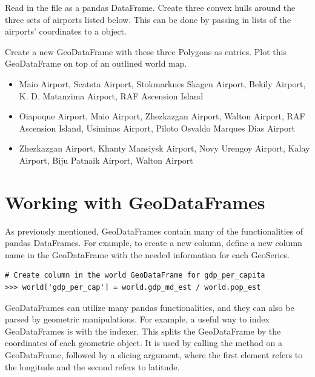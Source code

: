 \begin{problem}
Read in the file  as a pandas DataFrame.
Create three convex hulls around the three sets of airports listed below.
This can be done by passing in lists of the airports' coordinates to a  object.

Create a new GeoDataFrame with these three Polygons as entries.
Plot this GeoDataFrame on top of an outlined world map.
\begin{itemize} %
	\item Maio Airport, Scatsta Airport, Stokmarknes Skagen Airport, Bekily Airport, K. D. Matanzima Airport, RAF Ascension Island
	\item Oiapoque Airport, Maio Airport, Zhezkazgan Airport, Walton Airport, RAF Ascension Island, Usiminas Airport, Piloto Osvaldo Marques Dias Airport
	\item Zhezkazgan Airport, Khanty Mansiysk Airport, Novy Urengoy Airport, Kalay Airport, Biju Patnaik Airport, Walton Airport
\end{itemize}
\end{problem}

\section*{Working with GeoDataFrames} %

As previously mentioned, GeoDataFrames contain many of the functionalities of pandas DataFrames.
For example, to create a new column, define a new column name in the GeoDataFrame with the needed information for each GeoSeries.

\begin{lstlisting}
# Create column in the world GeoDataFrame for gdp_per_capita
>>> world['gdp_per_cap'] = world.gdp_md_est / world.pop_est
\end{lstlisting}

GeoDataFrames can utilize many pandas functionalities, and they can also be parsed by geometric manipulations.
For example, a useful way to index GeoDataFrames is with the  indexer.
This splits the GeoDataFrame by the coordinates of each geometric object.
It is used by calling the method  on a GeoDataFrame, followed by a slicing argument, where the first element refers to the longitude and the second refers to latitude.

